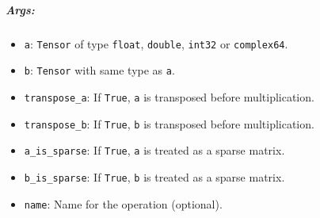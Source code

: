 \begin{Shaded}
\begin{Highlighting}[]
\OperatorTok{=} \NormalTok{tf.constant([}\NormalTok{, }\NormalTok{, }\NormalTok{, }\NormalTok{, }\NormalTok{, }\NormalTok{], shape}\OperatorTok{=}\NormalTok{[}\NormalTok{, }\NormalTok{]) }\OperatorTok{=>} \NormalTok{[[}\NormalTok{.]}
                                                      \NormalTok{[}\NormalTok{.]]}
\OperatorTok{=} \NormalTok{tf.constant([}\NormalTok{, }\NormalTok{, }\NormalTok{, }\NormalTok{, }\NormalTok{, }\NormalTok{], shape}\OperatorTok{=}\NormalTok{[}\NormalTok{, }\NormalTok{]) }\OperatorTok{=>} \NormalTok{[[}\NormalTok{.]}
                                                         \NormalTok{[}\NormalTok{.]}
                                                         \NormalTok{[}\NormalTok{.]]}
\OperatorTok{=} \OperatorTok{=>} \NormalTok{[[} \NormalTok{]}
                        \NormalTok{[} \NormalTok{]]}
\end{Highlighting}
\end{Shaded}

\subparagraph{Args: }\label{args-25}

\begin{itemize}
\tightlist
\item
  \texttt{a}: \texttt{Tensor} of type \texttt{float}, \texttt{double},
  \texttt{int32} or \texttt{complex64}.
\item
  \texttt{b}: \texttt{Tensor} with same type as \texttt{a}.
\item
  \texttt{transpose\_a}: If \texttt{True}, \texttt{a} is transposed
  before multiplication.
\item
  \texttt{transpose\_b}: If \texttt{True}, \texttt{b} is transposed
  before multiplication.
\item
  \texttt{a\_is\_sparse}: If \texttt{True}, \texttt{a} is treated as a
  sparse matrix.
\item
  \texttt{b\_is\_sparse}: If \texttt{True}, \texttt{b} is treated as a
  sparse matrix.
\item
  \texttt{name}: Name for the operation (optional).
\end{itemize}

